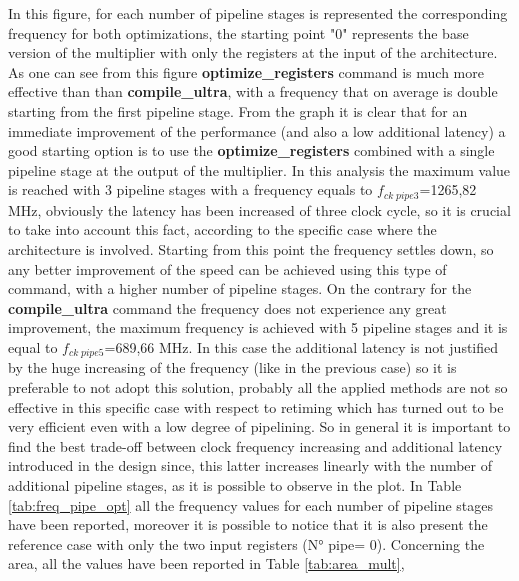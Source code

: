 \documentclass[a4paper, titlepage]{article}
\begin{document}
\newpage
\noindent
In this figure, for each number of pipeline stages is represented the corresponding frequency for both optimizations, the starting point "0" represents the base version of the multiplier with only the registers at the input of the architecture.
\newline
As one can see from this figure \textbf{optimize\_registers} command is much more effective than than \textbf{compile\_ultra}, with a frequency that on average is double starting from the first pipeline stage. From the graph it is clear that for an immediate improvement of the performance (and also a low additional latency) a good starting option is to use the \textbf{optimize\_registers} combined with a single pipeline stage at the output of the multiplier. In this analysis the maximum value is reached with 3 pipeline stages with a frequency equals to $f_{ck\; pipe 3}$=1265,82 MHz, obviously the latency has been increased of three clock cycle, so it is crucial to take into account this fact, according to the specific case where the architecture is involved. 
\newline
Starting from this point the frequency settles down, so any better improvement of the speed can be achieved using this type of command, with a higher number of pipeline stages.
\newline
On the contrary for the \textbf{compile\_ultra} command the frequency does not experience any great improvement, the maximum frequency is achieved with 5 pipeline stages and it is equal to  $f_{ck\; pipe 5}$=689,66 MHz. In this case the additional latency is not justified by the huge increasing of the frequency (like in the previous case) so it is preferable to not adopt this solution, probably all the applied methods are not so effective in this specific case with respect to retiming which has turned out to be very efficient even with a low degree of pipelining.
\newline
So in general it is important to find the best trade-off between clock frequency increasing and additional latency introduced in the design since, this latter increases linearly with the number of additional pipeline stages, as it is possible to observe in the plot.
\newline
In Table \ref{tab:freq_pipe_opt} all the frequency values for each number of pipeline stages have been reported, moreover it is possible to notice that it is also present the reference case with only the two input registers  (N° pipe= 0).
\newline
Concerning the area, all the values have been reported in Table \ref{tab:area_mult}, 
\end{document}
